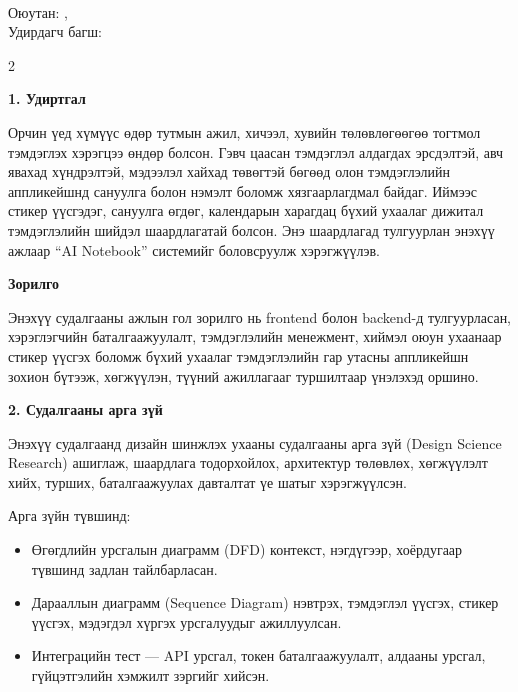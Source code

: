 \clearpage
{}
\setcounter{page}{1}

\thispagestyle{plain}

\begin{center}
{\large\bfseries \titlename}
\end{center}

\begin{flushright}
\small \departmentname\\
Оюутан: \studentID, \authorShort\\
Удирдагч багш: \supervisorname
\end{flushright}

\setlength{\columnsep}{5mm}
\setlength{\parindent}{0pt}

\begin{multicols}{2}

\small

\textbf{1. Удиртгал}

Орчин үед хүмүүс өдөр тутмын ажил, хичээл,
хувийн төлөвлөгөөгөө тогтмол тэмдэглэх
хэрэгцээ өндөр болсон. Гэвч цаасан
тэмдэглэл алдагдах эрсдэлтэй, авч явахад
хүндрэлтэй, мэдээлэл хайхад төвөгтэй бөгөөд
олон тэмдэглэлийн аппликейшнд сануулга
болон нэмэлт боломж хязгаарлагдмал байдаг.
Иймээс стикер үүсгэдэг, сануулга өгдөг,
календарын харагдац бүхий ухаалаг дижитал
тэмдэглэлийн шийдэл шаардлагатай болсон.
Энэ шаардлагад тулгуурлан энэхүү ажлаар
``AI Notebook'' системийг боловсруулж
хэрэгжүүлэв.

\textbf{Зорилго}

Энэхүү судалгааны ажлын гол зорилго нь
frontend болон backend-д тулгуурласан,
хэрэглэгчийн баталгаажуулалт, тэмдэглэлийн
менежмент, хиймэл оюун ухаанаар стикер
үүсгэх боломж бүхий ухаалаг тэмдэглэлийн
гар утасны аппликейшн зохион бүтээж,
хөгжүүлэн, түүний ажиллагааг туршилтаар
үнэлэхэд оршино.

\textbf{2. Судалгааны арга зүй}

Энэхүү судалгаанд дизайн шинжлэх ухааны
судалгааны арга зүй (Design Science Research)
ашиглаж, шаардлага тодорхойлох, архитектур
төлөвлөх, хөгжүүлэлт хийх, турших,
баталгаажуулах давталтат үе шатыг
хэрэгжүүлсэн.

Арга зүйн түвшинд:
\begin{itemize}
\item Өгөгдлийн урсгалын диаграмм (DFD)
контекст, нэгдүгээр, хоёрдугаар түвшинд
задлан тайлбарласан.
\item Дарааллын диаграмм (Sequence Diagram)
нэвтрэх, тэмдэглэл үүсгэх, стикер үүсгэх,
мэдэгдэл хүргэх урсгалуудыг ажиллуулсан.
\item Интеграцийн тест --- API урсгал, токен
баталгаажуулалт, алдааны урсгал,
гүйцэтгэлийн хэмжилт зэргийг хийсэн.
\end{itemize}


\end{multicols}
